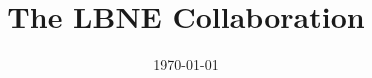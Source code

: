 \documentclass{report}
\title{The LBNE Collaboration}
\date{\today}
\begin{document}
\renewcommand\Authfont{\small}
\renewcommand\Affilfont{\itshape}
\maketitle %
\end{document}

